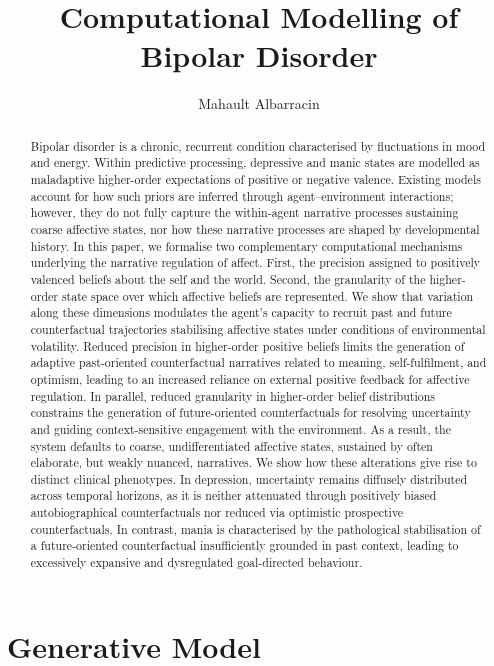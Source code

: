 \documentclass[11pt,a4paper]{article}
\title{Computational Modelling of Bipolar Disorder}
\author{Mahault Albarracin}
\date{}
\begin{document}
\maketitle

\begin{abstract}
Bipolar disorder is a chronic, recurrent condition characterised by fluctuations in mood and energy. Within predictive processing, depressive and manic states are modelled as maladaptive higher-order expectations of positive or negative valence. Existing models account for how such priors are inferred through agent--environment interactions; however, they do not fully capture the within-agent narrative processes sustaining coarse affective states, nor how these narrative processes are shaped by developmental history. In this paper, we formalise two complementary computational mechanisms underlying the narrative regulation of affect. First, the precision assigned to positively valenced beliefs about the self and the world. Second, the granularity of the higher-order state space over which affective beliefs are represented. We show that variation along these dimensions modulates the agent's capacity to recruit past and future counterfactual trajectories stabilising affective states under conditions of environmental volatility. Reduced precision in higher-order positive beliefs limits the generation of adaptive past-oriented counterfactual narratives related to meaning, self-fulfilment, and optimism, leading to an increased reliance on external positive feedback for affective regulation. In parallel, reduced granularity in higher-order belief distributions constrains the generation of future-oriented counterfactuals for resolving uncertainty and guiding context-sensitive engagement with the environment. As a result, the system defaults to coarse, undifferentiated affective states, sustained by often elaborate, but weakly nuanced, narratives. We show how these alterations give rise to distinct clinical phenotypes. In depression, uncertainty remains diffusely distributed across temporal horizons, as it is neither attenuated through positively biased autobiographical counterfactuals nor reduced via optimistic prospective counterfactuals. In contrast, mania is characterised by the pathological stabilisation of a future-oriented counterfactual insufficiently grounded in past context, leading to excessively expansive and dysregulated goal-directed behaviour.
\end{abstract}


\section{Generative Model}\label{sec:model}
\end{document}
